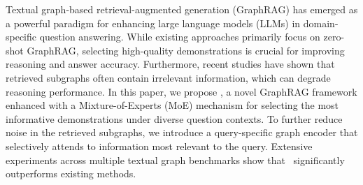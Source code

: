 
Textual graph-based retrieval-augmented generation (GraphRAG) has emerged as a powerful paradigm for enhancing large language models (LLMs) in domain-specific question answering. While existing approaches primarily focus on zero-shot GraphRAG, selecting high-quality demonstrations is crucial for improving reasoning and answer accuracy. Furthermore, recent studies have shown that retrieved subgraphs often contain irrelevant information, which can degrade reasoning performance.
In this paper, we propose \myModel, a novel GraphRAG framework enhanced with a Mixture-of-Experts (MoE) mechanism for selecting the most informative demonstrations under diverse question contexts. To further reduce noise in the retrieved subgraphs, we introduce a query-specific graph encoder that selectively attends to information most relevant to the query.
Extensive experiments across multiple textual graph benchmarks show that \myModel\ significantly outperforms existing methods.


